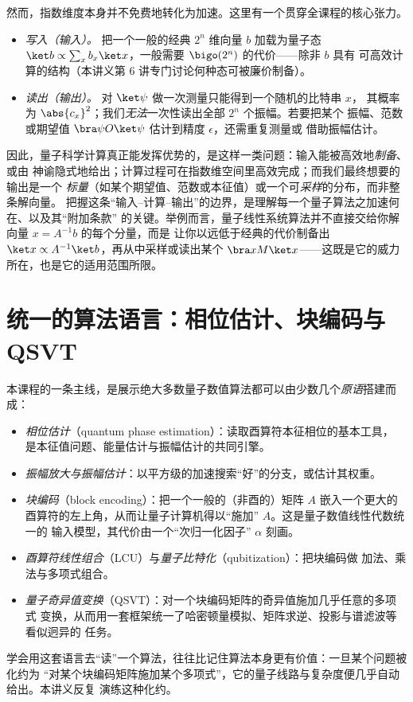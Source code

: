 然而，指数维度本身并不免费地转化为加速。这里有一个贯穿全课程的核心张力。
\begin{itemize}[leftmargin=1.4em]
  \item \emph{写入（输入）。} 把一个一般的经典 $2^n$ 维向量 $b$ 加载为量子态
        $\ket b\propto\sum_x b_x\ket x$，一般需要 $\bigo(2^n)$ 的代价——除非 $b$ 具有
        可高效计算的结构（本讲义第 6 讲专门讨论何种态可被廉价制备）。
  \item \emph{读出（输出）。} 对 $\ket\psi$ 做一次测量只能得到一个随机的比特串 $x$，
        其概率为 $\abs{c_x}^2$；我们\emph{无法}一次性读出全部 $2^n$ 个振幅。若要把某个
        振幅、范数或期望值 $\bra\psi O\ket\psi$ 估计到精度 $\epsilon$，还需重复测量或
        借助振幅估计。
\end{itemize}
因此，量子科学计算真正能发挥优势的，是这样一类问题：输入能被高效地\emph{制备}、或由
神谕隐式地给出；计算过程可在指数维空间里高效完成；而我们最终想要的输出是一个
\emph{标量}（如某个期望值、范数或本征值）或一个可\emph{采样}的分布，而非整条解向量。
把握这条``输入--计算--输出''的边界，是理解每一个量子算法之加速何在、以及其``附加条款''
的关键。举例而言，量子线性系统算法并不直接交给你解向量 $x=A^{-1}b$ 的每个分量，而是
让你以远低于经典的代价制备出 $\ket x\propto A^{-1}\ket b$，再从中采样或读出某个
$\bra x M\ket x$——这既是它的威力所在，也是它的适用范围所限。

\section*{统一的算法语言：相位估计、块编码与 QSVT}

本课程的一条主线，是展示绝大多数量子数值算法都可以由少数几个\emph{原语}搭建而成：
\begin{itemize}[leftmargin=1.4em]
  \item \emph{相位估计}（quantum phase estimation）：读取酉算符本征相位的基本工具，
        是本征值问题、能量估计与振幅估计的共同引擎。
  \item \emph{振幅放大与振幅估计}：以平方级的加速搜索``好''的分支，或估计其权重。
  \item \emph{块编码}（block encoding）：把一个一般的（非酉的）矩阵 $A$ 嵌入一个更大的
        酉算符的左上角，从而让量子计算机得以``施加'' $A$。这是量子数值线性代数统一的
        输入模型，其代价由一个``次归一化因子'' $\alpha$ 刻画。
  \item \emph{酉算符线性组合}（LCU）与\emph{量子比特化}（qubitization）：把块编码做
        加法、乘法与多项式组合。
  \item \emph{量子奇异值变换}（QSVT）：对一个块编码矩阵的奇异值施加几乎任意的多项式
        变换，从而用一套框架统一了哈密顿量模拟、矩阵求逆、投影与谱滤波等看似迥异的
        任务。
\end{itemize}
学会用这套语言去``读''一个算法，往往比记住算法本身更有价值：一旦某个问题被化约为
``对某个块编码矩阵施加某个多项式''，它的量子线路与复杂度便几乎自动给出。本讲义反复
演练这种化约。

